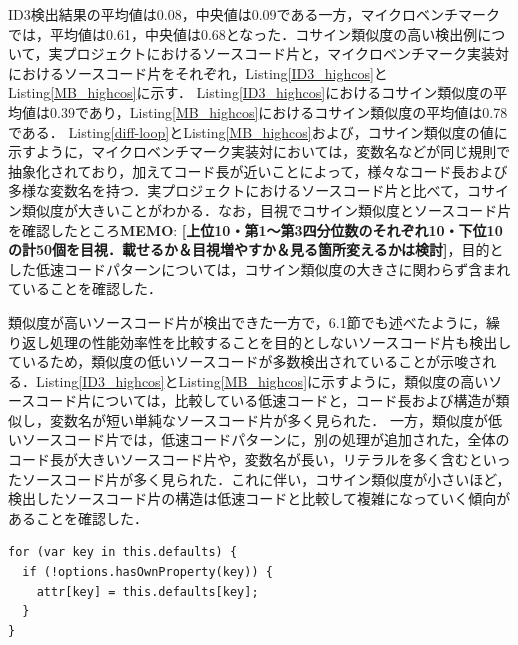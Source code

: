 \documentclass[submit,techrep,noauthor]{ipsj}
\newcommand{\memo}[1]{\colorbox{magenta!30}{{\bf MEMO}:}{\color{red!50} {\textbf{[#1]}}}}
\begin{document}
ID3検出結果の平均値は0.08，中央値は0.09である一方，マイクロベンチマークでは，平均値は0.61，中央値は0.68となった．コサイン類似度の高い検出例について，実プロジェクトにおけるソースコード片と，マイクロベンチマーク実装対におけるソースコード片をそれぞれ，Listing\ref{ID3_highcos}とListing\ref{MB_highcos}に示す．
Listing\ref{ID3_highcos}におけるコサイン類似度の平均値は0.39であり，Listing\ref{MB_highcos}におけるコサイン類似度の平均値は0.78である．
Listing\ref{diff-loop}とListing\ref{MB_highcos}および，コサイン類似度の値に示すように，マイクロベンチマーク実装対においては，変数名などが同じ規則で抽象化されており，加えてコード長が近いことによって，様々なコード長および多様な変数名を持つ．実プロジェクトにおけるソースコード片と比べて，コサイン類似度が大きいことがわかる．なお，目視でコサイン類似度とソースコード片を確認したところ\memo{上位10・第1〜第3四分位数のそれぞれ10・下位10の計50個を目視．載せるか＆目視増やすか＆見る箇所変えるかは検討}，目的とした低速コードパターンについては，コサイン類似度の大きさに関わらず含まれていることを確認した．

類似度が高いソースコード片が検出できた一方で，6.1節でも述べたように，繰り返し処理の性能効率性を比較することを目的としないソースコード片も検出しているため，類似度の低いソースコードが多数検出されていることが示唆される．Listing\ref{ID3_highcos}とListing\ref{MB_highcos}に示すように，類似度の高いソースコード片については，比較している低速コードと，コード長および構造が類似し，変数名が短い単純なソースコード片が多く見られた．
一方，類似度が低いソースコード片では，低速コードパターンに，別の処理が追加された，全体のコード長が大きいソースコード片や，変数名が長い，リテラルを多く含むといったソースコード片が多く見られた．これに伴い，コサイン類似度が小さいほど，検出したソースコード片の構造は低速コードと比較して複雑になっていく傾向があることを確認した．





\begin{lstlisting}[caption=実プロジェクトにおける類似度の高い検出例, label=ID3_highcos, captionpos=t, columns=flexible]
for (var key in this.defaults) {
  if (!options.hasOwnProperty(key)) {
    attr[key] = this.defaults[key];
  }
}
\end{lstlisting}
\end{document}
